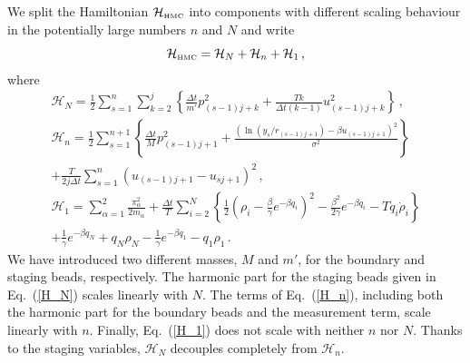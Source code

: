 \documentclass[12pt,a4paper,final]{iopart}
\begin{document}
We split the Hamiltonian $\mathcal{H}_{\mbox{\tiny HMC}}$ into components with different scaling behaviour in the potentially large numbers $n$ and $N$ and write
\begin{equation}
  \mathcal{H}_{\mbox{\tiny HMC}}= \mathcal H_N+\mathcal H_n+\mathcal H_1\,,
\end{equation}
where
\begin{eqnarray}
  \mathcal H_N =
  \frac{1}{2}
  \sum_{s=1}^{n}
  \sum_{k=2}^j
  \left\{
    \frac{\Delta t}{m'}p_{(s-1)j+k}^2
    +
    \frac{Tk}{\Delta t(k-1)}
    u_{(s-1)j+k}^2
  \right\}\,,\label{H_N}
  \\
  \mathcal H_n =
  \frac{1}{2}
  \sum_{s=1}^{n+1}
  \left\{
   \frac{\Delta t }{M}p_{(s-1)j+1}^2
    +
    \frac{(\ln(y_s/r_{(s-1)j+1}) - {\beta u_{(s-1)j+1}})^2}{\sigma^2}
   \right\} \nonumber
   \\
  +
  \frac{T}{2j\Delta t}
  \sum_{s=1}^{n}
    (u_{(s-1)j+1} - u_{sj+1})^2
   \,, \label{H_n} \\
  \mathcal H_1=
   \sum_{\alpha=1}^2\frac{\pi_\alpha^2}{2m_\alpha}
   +
  \frac{\Delta t}{T}
   \sum_{i=2}^{N}
   \left\{
    \frac{1}{2}
     \left(
        \rho_i-\frac{\beta}{\gamma}e^{-\beta q_i}
     \right)^2
    -
    \frac{\beta^2}{2\gamma}
    e^{-\beta q_i}
   -
    T q_i\dot\rho_i
   \right\} \nonumber
  \\
  +
  \frac{1}{\gamma}
  e^{-\beta q_N}
  +
  q_N \rho_{N}
  -
  \frac{1}{\gamma}
  e^{-\beta q_1}
  -
  q_1 \rho_{1} \,. \label{H_1}
\end{eqnarray}
We have introduced two different masses, $M$ and $m'$, for the boundary and staging beads, respectively.
The harmonic part for the staging beads given in Eq.~(\ref{H_N}) scales linearly with $N$. The terms of Eq.~(\ref{H_n}), including both the harmonic part for the boundary beads and the measurement term, scale linearly with $n$. Finally, Eq.~(\ref{H_1}) does not scale with neither $n$ nor $N$.
Thanks to the staging variables, $\mathcal H_N$ decouples completely from $\mathcal H_n$.
\end{document}
